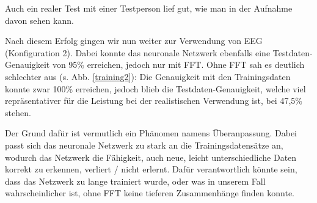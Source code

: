 \documentclass[11pt]{scrartcl}
\begin{document}
	\begin{figure}[H]
	\end{figure}

	Auch ein realer Test mit einer Testperson lief gut, wie man in der Aufnahme davon sehen kann. \cite{projekt-video}

	Nach diesem Erfolg gingen wir nun weiter zur Verwendung von EEG (Konfiguration 2). Dabei konnte das neuronale Netzwerk ebenfalls eine Testdaten-Genauigkeit von 95\% erreichen, jedoch nur mit FFT. Ohne FFT sah es deutlich schlechter aus (s. Abb. \ref{training2}): Die Genauigkeit mit den Trainingsdaten konnte zwar 100\% erreichen, jedoch blieb die Testdaten-Genauigkeit, welche viel repräsentativer für die Leistung bei der realistischen Verwendung ist, bei 47,5\% stehen.

	Der Grund dafür ist vermutlich ein Phänomen namens Überanpassung. Dabei passt sich das neuronale Netzwerk zu stark an die Trainingsdatensätze an, wodurch das Netzwerk die Fähigkeit, auch neue, leicht unterschiedliche Daten korrekt zu erkennen, verliert / nicht erlernt. Dafür verantwortlich könnte sein, dass das Netzwerk zu lange trainiert wurde, oder was in unserem Fall wahrscheinlicher ist, ohne FFT keine tieferen Zusammenhänge finden konnte.
\end{document}
